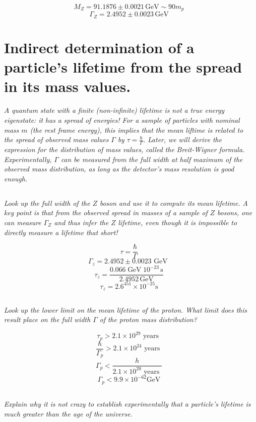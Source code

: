 \documentclass[12pt, letterpaper]{article}
\begin{document}
$$
M_{Z}=91.1876 \pm 0.0021\, \mathrm{GeV} \sim 90 m_p
$$
$$
\Gamma_{Z}=2.4952 \pm 0.0023\, \mathrm { GeV }
$$

\section{Indirect determination of a particle's lifetime from the spread in its mass values.} 
\textit{ $A$ quantum state with a finite (non-infinite) lifetime is not a true
energy eigenstate: it has a spread of energies! For a sample of particles with nominal mass $m$ (the rest frame energy), this implies that the mean liftime is related to the spread of observed mass values $\Gamma$ by $\tau=\frac{\hbar} { \Gamma}$. Later, we will derive the expression for the distribution of mass values, called the Breit-Wigner formula. Experimentally, $\Gamma$ can be measured from the full width at half maximum of the observed mass distribution, as long as the detector's mass resolution is good enough.}

\subsection{}
\textit{Look up the full width of the $Z$ boson and use it to compute its mean lifetime. A key point is that from the observed spread in masses of a sample of $Z$ bosons, one can measure $\Gamma_{Z}$ and thus infer the $Z$ lifetime, even though it is impossible to directly measure a lifetime that short!}

$$
\tau=\frac{\hbar}{\Gamma}
$$
$$
\Gamma_{z}=2.4952 \pm 0.0023 \text { GeV }
$$
$$
\tau_{z}=\frac{0.066 \operatorname{GeV} 10^{-23}\, \mathrm{s}}{2.4952 \,\mathrm{GeV}}
$$
$$\boxed{
\tau_{z}=2.6^{451} \times 10^{-25} \mathrm{s}}
$$

\subsection{}
\textit{Look up the lower limit on the mean lifetime of the proton. What limit does this result place on the full width $\Gamma$ of the proton mass distribution?}

$$
\tau_p > 2.1 \times 10^{29} \text { years } 
$$
$$
\frac{\hbar}{\Gamma_p}>2.1 \times 10^{24} \text { years }
$$
$$
\Gamma_{p}<\frac{h}{2.1\times10^{2 0} \text { years }}
$$
$$\boxed{
\Gamma_{p}<9.9 \times 10^{-62} \mathrm{GeV}}
$$

\subsection{}
\textit{Explain why it is not crazy to establish experimentally that a particle's lifetime is much greater than the age of the universe.}
\end{document}
